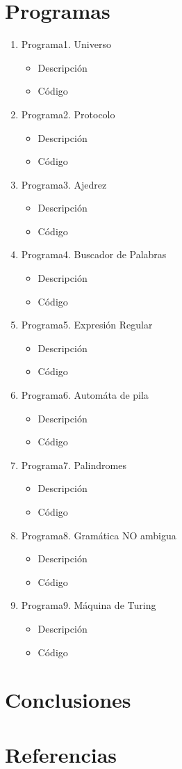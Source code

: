 \documentclass{article}
\begin{document}
	\section*{Programas}
	\begin{enumerate}
		\item Programa1. Universo	
			\begin{itemize}
				\item Descripción
				\item Código
			\end{itemize}
		\item Programa2. Protocolo
		\begin{itemize}
			\item Descripción
			\item Código
		\end{itemize}
		\item Programa3. Ajedrez
		\begin{itemize}
			\item Descripción
			\item Código
		\end{itemize}
		\item Programa4. Buscador de Palabras
		\begin{itemize}
			\item Descripción
			\item Código
		\end{itemize}
		\item Programa5. Expresión Regular
		\begin{itemize}
			\item Descripción
			\item Código
		\end{itemize}
		\item Programa6. Automáta de pila
		\begin{itemize}
			\item Descripción
			\item Código
		\end{itemize}
		\item Programa7. Palindromes
		\begin{itemize}
			\item Descripción
			\item Código
		\end{itemize}
		\item Programa8. Gramática NO ambigua
		\begin{itemize}
			\item Descripción
			\item Código
		\end{itemize}
		\item Programa9. Máquina de Turing		
		\begin{itemize}
			\item Descripción
			\item Código
		\end{itemize}
	\end{enumerate}
	
	\section*{Conclusiones}
	
	\section*{Referencias}
	
	
\end{document}
